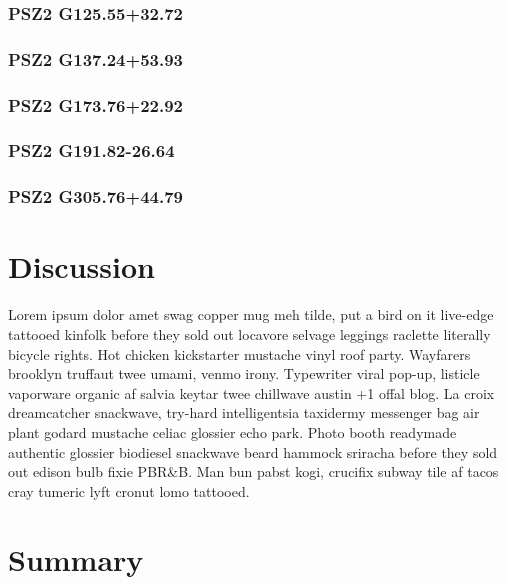 \documentclass[apj, revtex4-1]{emulateapj}
\begin{document}
\subsubsection{PSZ2 G125.55+32.72}
\subsubsection{PSZ2 G137.24+53.93}
\subsubsection{PSZ2 G173.76+22.92}
\subsubsection{PSZ2 G191.82-26.64}
\subsubsection{PSZ2 G305.76+44.79}


\section{Discussion}\label{sec:discussion}

Lorem ipsum dolor amet swag copper mug meh tilde, put a bird on it live-edge tattooed kinfolk before they sold out locavore selvage leggings raclette literally bicycle rights. Hot chicken kickstarter mustache vinyl roof party. Wayfarers brooklyn truffaut twee umami, venmo irony. Typewriter viral pop-up, listicle vaporware organic af salvia keytar twee chillwave austin +1 offal blog. La croix dreamcatcher snackwave, try-hard intelligentsia taxidermy messenger bag air plant godard mustache celiac glossier echo park. Photo booth readymade authentic glossier biodiesel snackwave beard hammock sriracha before they sold out edison bulb fixie PBR\&B. Man bun pabst kogi, crucifix subway tile af tacos cray tumeric lyft cronut lomo tattooed.

\section{Summary}\label{sec:summary}
\end{document}
